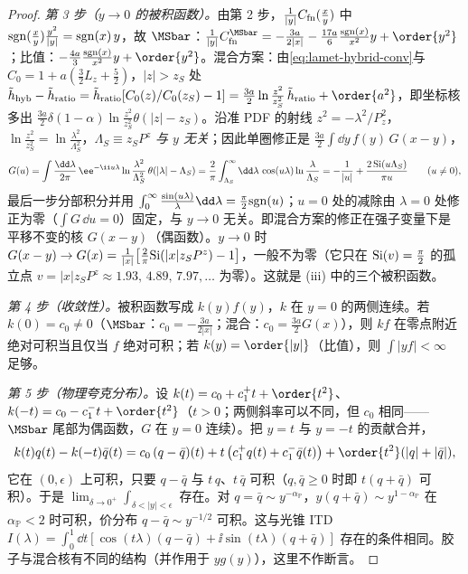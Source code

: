 \begin{proof}
\emph{第 3 步（$y\to0$ 的被积函数）。}由第 2 步，$\frac1{|y|}C_{\rm fn}(\frac xy)$ 中 ${\rm sgn}(\frac xy)\frac{y^2}{|y|}={\rm sgn}(x)\,y$，故 $\MSbar$：$\frac1{|y|}C^{\MSbar}_{\rm fn}=-\frac{3a}{2|x|}-\frac{17a}6\frac{{\rm sgn}(x)}{x^2}y+\order{y^2}$；比值：$-\frac{4a}3\frac{{\rm sgn}(x)}{x^2}y+\order{y^2}$。混合方案：由\cref{eq:lamet-hybrid-conv}与 $C_0=1+a(\frac32L_z+\frac52)$，$|z|>z_S$ 处 $\tilde h_{\rm hyb}-\tilde h_{\rm ratio}=\tilde h_{\rm ratio}[C_0(z)/C_0(z_S)-1]=\frac{3a}2\ln\frac{z^2}{z_S^2}\,\tilde h_{\rm ratio}+\order{a^2}$，即坐标核多出 $\frac{3a}2\delta(1-\alpha)\ln\frac{z^2}{z_S^2}\theta(|z|-z_S)$。沿准 PDF 的射线 $z^2=-\lambda^2/P_z^2$，$\ln\frac{z^2}{z_S^2}=\ln\frac{\lambda^2}{\Lambda_S^2}$，$\Lambda_S\equiv z_SP^z$ \emph{与 $y$ 无关}；因此单圈修正是 $\frac{3a}2\int\dd y\,f(y)\,G(x-y)$，
\[
G(u)=\int\frac{\dd\lambda}{2\pi}\,\ee^{-\ii u\lambda}\ln\frac{\lambda^2}{\Lambda_S^2}\,\theta(|\lambda|-\Lambda_S)=\frac2\pi\int_{\Lambda_S}^\infty\dd\lambda\,\cos(u\lambda)\ln\frac\lambda{\Lambda_S}=-\frac1{|u|}+\frac{2\,{\rm Si}(u\Lambda_S)}{\pi u}\qquad(u\neq0),
\]
最后一步分部积分并用 $\int_0^\infty\frac{\sin(u\lambda)}\lambda\dd\lambda=\frac\pi2{\rm sgn}(u)$；$u=0$ 处的减除由 $\lambda=0$ 处修正为零（$\int G\,\dd u=0$）固定，与 $y\to0$ 无关。即混合方案的修正在强子变量下是平移不变的核 $G(x-y)$（偶函数）。$y\to0$ 时 $G(x-y)\to G(x)=\frac1{|x|}\big[\frac2\pi{\rm Si}(|x|z_SP^z)-1\big]$，一般不为零（它只在 ${\rm Si}(v)=\frac\pi2$ 的孤立点 $v=|x|z_SP^z\approx1.93,\,4.89,\,7.97,\dots$ 为零）。这就是 (iii) 中的三个被积函数。

\emph{第 4 步（收敛性）。}被积函数写成 $k(y)f(y)$，$k$ 在 $y=0$ 的两侧连续。若 $k(0)=c_0\neq0$（$\MSbar$：$c_0=-\frac{3a}{2|x|}$；混合：$c_0=\frac{3a}2G(x)$），则 $kf$ 在零点附近绝对可积当且仅当 $f$ 绝对可积；若 $k(y)=\order{|y|}$（比值），则 $\int|yf|<\infty$ 足够。

\emph{第 5 步（物理夸克分布）。}设 $k(t)=c_0+c_1^+t+\order{t^2}$、$k(-t)=c_0-c_1^-t+\order{t^2}$（$t>0$；两侧斜率可以不同，但 $c_0$ 相同——$\MSbar$ 尾部为偶函数，$G$ 在 $y=0$ 连续）。把 $y=t$ 与 $y=-t$ 的贡献合并，
\[
k(t)q(t)-k(-t)\bar q(t)=c_0\,(q-\bar q)(t)+t\,\big(c_1^+q(t)+c_1^-\bar q(t)\big)+\order{t^2}(|q|+|\bar q|),
\]
它在 $(0,\epsilon)$ 上可积，只要 $q-\bar q$ 与 $t\,q$、$t\,\bar q$ 可积（$q,\bar q\ge0$ 时即 $t(q+\bar q)$ 可积）。于是 $\lim_{\delta\to0^+}\int_{\delta<|y|<\epsilon}$ 存在。对 $q=\bar q\sim y^{-\alpha_{\mathbb P}}$，$y(q+\bar q)\sim y^{1-\alpha_{\mathbb P}}$ 在 $\alpha_{\mathbb P}<2$ 时可积，价分布 $q-\bar q\sim y^{-1/2}$ 可积。这与光锥 ITD $I(\lambda)=\int_0^1\dd t[\cos(t\lambda)(q-\bar q)+\ii\sin(t\lambda)(q+\bar q)]$ 存在的条件相同。胶子与混合核有不同的结构（并作用于 $yg(y)$），这里不作断言。


\end{proof}

